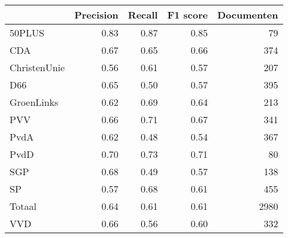\begin{tabular}{lrrrr}
\toprule
{} &  Precision &  Recall &  F1 score &  Documenten \\
\midrule
50PLUS       &       0.83 &    0.87 &      0.85 &          79 \\
CDA          &       0.67 &    0.65 &      0.66 &         374 \\
ChristenUnie &       0.56 &    0.61 &      0.57 &         207 \\
D66          &       0.65 &    0.50 &      0.57 &         395 \\
GroenLinks   &       0.62 &    0.69 &      0.64 &         213 \\
PVV          &       0.66 &    0.71 &      0.67 &         341 \\
PvdA         &       0.62 &    0.48 &      0.54 &         367 \\
PvdD         &       0.70 &    0.73 &      0.71 &          80 \\
SGP          &       0.68 &    0.49 &      0.57 &         138 \\
SP           &       0.57 &    0.68 &      0.61 &         455 \\
Totaal       &       0.64 &    0.61 &      0.61 &        2980 \\
VVD          &       0.66 &    0.56 &      0.60 &         332 \\
\bottomrule
\end{tabular}
